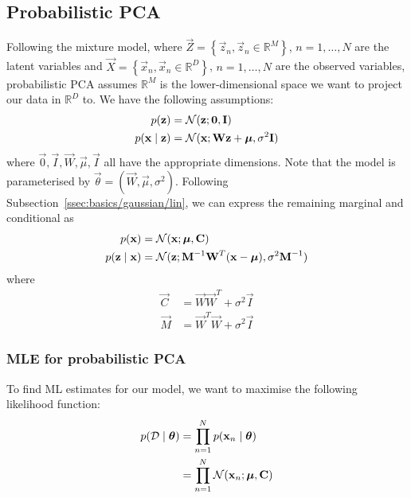 \subsection{Probabilistic PCA}
Following the mixture model, where $\vec Z = \left\{\vec z_n, \vec z_n \in \mathbb R^M\right\}$, $n = 1, \dotsc, N$ are the latent variables and $\vec X = \left\{\vec x_n, \vec x_n \in \mathbb R^D\right\}$, $n = 1, \dotsc, N$ are the observed variables, probabilistic PCA assumes $\mathbb R^M$ is the lower-dimensional space we want to project our data in $\mathbb R^D$ to. We have the following assumptions:
\begin{align*}
    p(\boldsymbol{\mathbf{z}})               &= \operatorname{\mathcal N}(\boldsymbol{\mathbf{z}}; \boldsymbol{\mathbf{0}}, \boldsymbol{\mathbf{I}}) \\
    p(\boldsymbol{\mathbf{x}} \mid \boldsymbol{\mathbf{z}})   &= \operatorname{\mathcal N}(\boldsymbol{\mathbf{x}}; \boldsymbol{\mathbf{W}} \boldsymbol{\mathbf{z}} + \boldsymbol{\mathbf{\mu}}, \sigma^2 \boldsymbol{\mathbf{I}})
\end{align*}
where $\vec 0, \vec I, \vec W, \vec \mu, \vec I$ all have the appropriate dimensions. Note that the model is parameterised by $\vec \theta = \left(\vec W, \vec \mu, \sigma^2\right)$. Following Subsection~\ref{ssec:basics/gaussian/lin}, we can express the remaining marginal and conditional as
\begin{align*}
    p(\boldsymbol{\mathbf{x}})               &= \operatorname{\mathcal N}(\boldsymbol{\mathbf{x}}; \boldsymbol{\mathbf{\mu}}, \boldsymbol{\mathbf{C}}) \\
    p(\boldsymbol{\mathbf{z}} \mid \boldsymbol{\mathbf{x}})   &= \operatorname{\mathcal N}(\boldsymbol{\mathbf{z}}; \boldsymbol{\mathbf{M}}^{-1} \boldsymbol{\mathbf{W}}^T (\boldsymbol{\mathbf{x}} - \boldsymbol{\mathbf{\mu}}), \sigma^2 \boldsymbol{\mathbf{M}}^{-1})
\end{align*}
where
\begin{align*}
    \vec C      &= \vec W \vec W^T + \sigma^2 \vec I \\
    \vec M      &= \vec W^T \vec W + \sigma^2 \vec I
\end{align*}

\subsubsection{MLE for probabilistic PCA}
To find ML estimates for our model, we want to maximise the following likelihood function:
\begin{align*}
    p(\mathcal D \mid \boldsymbol{\mathbf{\theta}})  &= \prod_{n = 1}^N p(\boldsymbol{\mathbf{x}}_n \mid \boldsymbol{\mathbf{\theta}}) \\
                                    &= \prod_{n = 1}^N \operatorname{\mathcal N}(\boldsymbol{\mathbf{x}}_n ; \boldsymbol{\mathbf{\mu}}, \boldsymbol{\mathbf{C}})
\end{align*}

